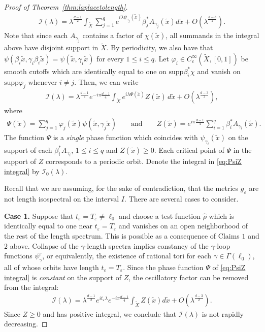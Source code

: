 \documentclass[11pt,letterpaper,oneside]{amsart}
\newcommand{\supp}{\text{supp}}
\renewcommand{\phi}{\varphi}
\theoremstyle{definition}
\theoremstyle{remark}
\newcommand{\eps}{\varepsilon}
\newcommand{\wt}{\widetilde}
\newcommand{\wh}{\widehat}
\newcommand{\I}{\mathcal{I}}
\theoremstyle{definition}
\theoremstyle{remark}
\begin{document}
\begin{proof}[Proof of Theorem~\ref{thm:laplacetolength}]
    \begin{align*}
        \I(\lambda) = \lambda^{\frac{d-1}{2}} \int_{\wt X} \sum_{j = 1}^q e^{i \lambda \psi_{\gamma_j}(\wt x)} \beta_j^* A_{\gamma_j}(\wt x) d \wt x + O\left(\lambda^{\frac{d-3}{2}}\right).
    \end{align*}
    Note that since each $A_{\gamma_j}$ contains a factor of $\chi(\wt x)$, all summands in the integral above have disjoint support in $\wt X$. By periodicity, we also have that $\psi(\beta_i \wt x, \gamma_i \beta_i \wt x) = \psi ( \wt x, \gamma_i \wt x)$ for every $1 \leq i \leq q$. Let $\phi_i \in C_c^\infty(\wt X, [0,1])$ be smooth cutoffs which are identically equal to one on $\supp \beta_i^* \chi$ and vanish on $\supp \phi_j$ whenever $i \neq j$. Then, we can write
    \begin{align}
    \label{eq:PsiZ integral}
        \I(\lambda) = \lambda^{\frac{d-1}{2}} e^{- i \pi \frac{d-1}{4}} \int_{\wt X} e^{i \lambda \Psi (\wt x)} Z(\wt x)\, d \wt x  + O\left(\lambda^{\frac{d-3}{2}}\right),
    \end{align}
    where
    \begin{align*}
        \Psi(\wt x) = \sum_{j = 1}^q \phi_j(\wt x) \psi(\wt x, \gamma_j \wt x) \qquad \text{and} \qquad
        Z(\wt x) = e^{i\pi \frac{d-1}{4}} \sum_{i = 1}^q \beta_i^* A_{\gamma_i}(\wt x).
    \end{align*}
    The function $\Psi$ is a \textit{single} phase function which coincides with $\psi_{\gamma_i}(\wt x)$ on the support of each $\beta_i^*A_{\gamma_i}$, $1 \leq i \leq q$ and $Z(\wt x) \geq 0$. Each critical point of $\Psi$ in the support of $Z$ corresponds to a periodic orbit. Denote the integral in \eqref{eq:PsiZ integral} by $\I_0(\lambda)$.

    \medskip
    
    {Recall that we are assuming, for the sake of contradiction, that the metrics $g_\eps$ are not length isospectral on the interval $I$. There are several cases to consider.}
    
    \medskip
    
    \noindent \textbf{Case 1.} Suppose that $t_\eps = T_\eps \neq \ell_0$ and choose a test function $\wh \rho$ which is identically equal to one near $t_\eps = T_\eps$ and vanishes on an open neighborhood of the rest of the length spectrum. This is possible as a consequence of Claims $1$ and $2$ above. Collapse of the $\gamma$-length spectra implies constancy of the $\gamma$-loop functions $\psi_\gamma^\eps$, or equivalently, the existence of rational tori for each $\gamma \in \Gamma(\ell_0)$, all of whose orbits have length $t_\eps = T_\eps$. Since the phase function $\Psi$ of \eqref{eq:PsiZ integral} is \textit{constant} on the support of $Z$, {the oscillatory factor can be removed from the integral:
    \begin{align*}
        \I(\lambda) = \lambda^{\frac{d-1}{2}} e^{i t_\eps \lambda } e^{- i \pi \frac{d-1}{4}} \int_{\wt X} Z(\wt x) d \wt x + O(\lambda^{\frac{d-3}{2}}).
    \end{align*}
    Since $Z \geq 0$ and has positive integral, we conclude that $\I(\lambda)$ is not rapidly decreasing.}
    

\end{proof}
\end{document}
